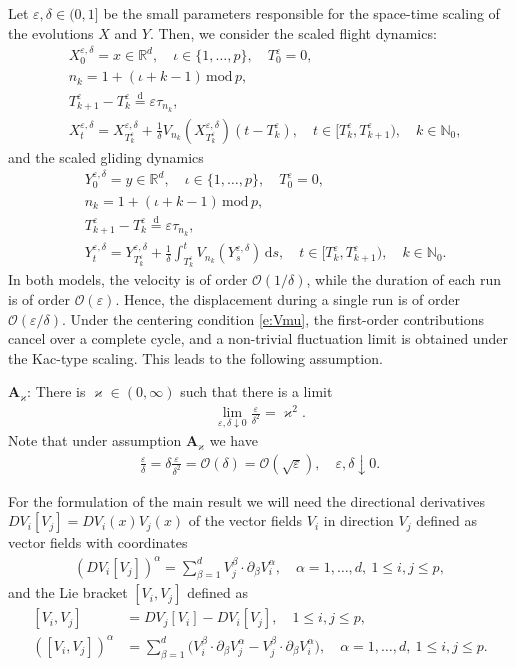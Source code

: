 \documentclass[10pt]{article}
\newcommand{\1}{1\!\!\!\;{\rm I}}
\theoremstyle{plain}
\theoremstyle{definition}
\newcommand{\e}{\varepsilon}
\newcommand{\ba}{\begin{equation}\begin{aligned}}
\newcommand{\ea}{\end{aligned}\end{equation}}
\newcommand{\di}{\mathrm{d}}
\newcommand{\bR}{\mathbb{R}}
\numberwithin{equation}{section}
\begin{document}
Let $\e,\delta\in(0,1]$ be the small parameters responsible for the space-time scaling of the evolutions $X$ and $Y$. Then,
we consider the scaled flight dynamics:
\ba
\label{e:Xe}
&X_0^{\e,\delta}=x\in\bR^d,\quad \iota \in \{1,\dots, p\},\quad T^\e_0=0,\\
&n_k=1+ (\iota + k-1)  \,\mathrm{ mod}\, p,\\
&T^\e_{k+1}-T^\e_k\stackrel{\di }{=}\e \tau_{n_{k}},\\
&X_{t}^{\e,\delta} = X^{\e,\delta}_{T_k^\e}
+ \frac{1}{\delta}V_{n_{k}}(X^{\e,\delta}_{T_k^\e}) (t-T^\e_k),\quad t\in[T^\e_k,T^\e_{k+1}),
\quad  k\in\mathbb N_0,
\ea
and the scaled gliding dynamics
\ba
&Y_0^{\e,\delta}=y\in\bR^d,\quad \iota \in \{1,\dots, p\},\quad T^\e_0=0,\\
&n_k=1+ (\iota + k-1)  \,\mathrm{ mod}\, p,\\
&T^\e_{k+1}-T^\e_k\stackrel{\di }{=}\e \tau_{n_{k}},\\
&Y_{t}^{\e,\delta} = Y^{\e,\delta}_{T_k^\e} + \frac{1}{\delta}\int_{T_k^\e}^t V_{n_{k}} (Y^{\e,\delta}_s) \,\di s ,
\quad t\in[T_k^\e,T_{k+1}^\e), \quad  k\in\mathbb N_0.
\ea
In both models, the velocity is of order $\mathcal{O}(1/\delta)$, while the duration of each run is of order $\mathcal{O}(\e)$.
Hence, the displacement during a single run is of order $\mathcal{O}(\e/\delta)$. Under the centering condition \eqref{e:Vmu},
the first-order contributions cancel over a complete cycle, and a non-trivial fluctuation limit is obtained under
the Kac-type scaling. This leads to the following assumption.

\noindent
$\mathbf{A}_\varkappa$: There is $\varkappa\in (0,\infty)$ such that there is a limit
\ba
\lim_{\e,\delta\downarrow 0 }\frac{\e}{\delta^2}=\varkappa^2.
\ea
Note that under assumption $\mathbf{A}_\varkappa$ we have
\ba
\frac{\e}{\delta}= \delta \frac{\e}{\delta^2}=\mathcal O(\delta)=\mathcal O(\sqrt{\e}),\quad \e,\delta\downarrow 0 .
\ea




For the formulation of the main result we will need the directional derivatives $D V_i[V_j]=DV_i(x)V_j(x)$ of the vector fields $V_i$
in direction $V_j$ defined as
vector fields with coordinates
\ba
\label{e:DVV}
(D V_i[V_j])^\alpha = \sum_{\beta=1}^d V_j^\beta   \cdot  \partial_\beta V_i^\alpha,\quad \alpha=1,\dots, d,\  1\leq i,j\leq p,
\ea
and the Lie bracket $[V_i,V_j]$ defined as
\ba
{} [V_i,V_j]&= D V_j [ V_i] - D V_i [ V_j],\quad 1\leq i,j\leq p,\\
([V_i,V_j])^\alpha &
= \sum_{\beta=1}^d  \Big(V_i^\beta  \cdot  \partial_\beta V_j^\alpha
- V_j^\beta \cdot \partial_\beta V_i^\alpha\Big) ,\quad \alpha=1,\dots, d,\  1\leq i,j\leq p.
\ea
\end{document}
